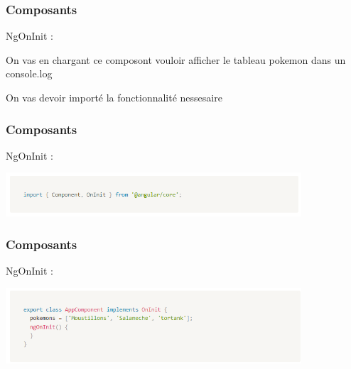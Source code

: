 \documentclass[10pt]{beamer}
\begin{document}
	\begin{frame}
		\frametitle{Composants}

		NgOnInit : \newline \newline

		On vas en chargant ce composont \newline vouloir afficher le tableau pokemon dans un console.log \newline \newline

		On vas devoir importé la fonctionnalité nessesaire  \newline \newline


	\end{frame}

	\begin{frame}
		\frametitle{Composants}

		NgOnInit : \newline \newline


		\centering
		\includegraphics[width=11cm]{assets/ngoninit1} \newline


	\end{frame}

	\begin{frame}
		\frametitle{Composants}

		NgOnInit : \newline \newline


		\centering
		\includegraphics[width=11cm]{assets/ngoninit2} \newline


	\end{frame}
\end{document}
